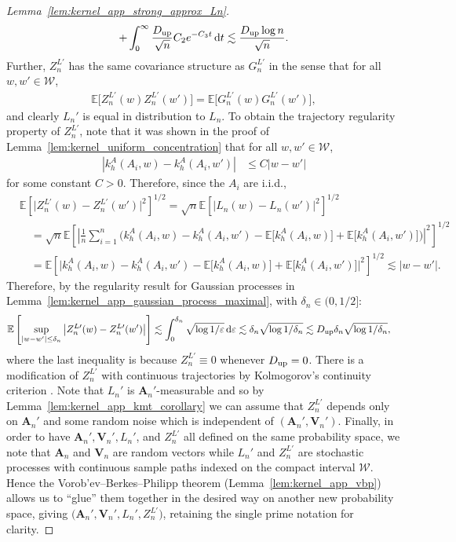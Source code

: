\documentclass[11pt,lof]{puthesis}
\newcommand{\E}{\ensuremath{\mathbb{E}}}
\newcommand{\bA}{\ensuremath{\mathbf{A}}}
\newcommand{\bV}{\ensuremath{\mathbf{V}}}
\newcommand{\cW}{\ensuremath{\mathcal{W}}}
\newcommand{\Du}{\ensuremath{D_{\textup{up}}}}
\newcommand{\diff}[1]{\,\mathrm{d}#1}
\theoremstyle{break}
\theoremstyle{proof}
\newtheorem{proof}{Proof}
\begin{document}
\begin{proof}[Lemma~\ref{lem:kernel_app_strong_approx_Ln}]
\begin{align*}
+ \int_0^\infty
\frac{\Du}{\sqrt n}
C_2 e^{-C_3 t}
\diff{t}
\lesssim
\frac{\Du \log n}{\sqrt n}.
\end{align*}
%
Further,
$Z_n^{L\prime}$ has the
same covariance structure as $G_n^{L\prime}$ in the
sense that for all $w, w' \in \cW$,
%
\begin{align*}
\E\big[Z_n^{L\prime}(w) Z_n^{L\prime}(w')\big]
= \E\big[G_n^{L\prime}(w) G_n^{L\prime}(w')\big],
\end{align*}
%
and clearly $L_n'$
is equal in distribution to $L_n$.
To obtain the trajectory regularity property of
$Z_n^{L\prime}$,
note that it was shown in the proof of
Lemma~\ref{lem:kernel_uniform_concentration}
that for all $w,w' \in \cW$,
%
\begin{align*}
\left|
k_h^A(A_i,w)
- k_h^A(A_i,w')
\right|
&\leq
C
|w-w'|
\end{align*}
%
for some constant $C > 0$.
Therefore, since the $A_i$ are i.i.d.,
%
\begin{align*}
&\E\left[
\big|
Z_n^{L\prime}(w)
- Z_n^{L\prime}(w')
\big|^2
\right]^{1/2}
=
\sqrt{n}
\E\left[
\big|
L_n(w)
- L_n(w')
\big|^2
\right]^{1/2} \\
&\quad=
\sqrt{n}
\E\left[
\left|
\frac{1}{n}
\sum_{i=1}^n
\Big(
k_h^A(A_i,w)
- k_h^A(A_i,w')
- \E\big[k_h^A(A_i,w)]
+ \E\big[k_h^A(A_i,w')]
\Big)
\right|^2
\right]^{1/2} \\
&\quad=
\E\left[
\Big|
k_h^A(A_i,w)
- k_h^A(A_i,w')
- \E\big[k_h^A(A_i,w)]
+ \E\big[k_h^A(A_i,w')]
\Big|^2
\right]^{1/2}
\lesssim
|w-w'|.
\end{align*}
%
Therefore, by
the regularity result for Gaussian processes in
Lemma~\ref{lem:kernel_app_gaussian_process_maximal},
with $\delta_n \in (0, 1/2]$:
%
\begin{align*}
\E\left[
\sup_{|w-w'| \leq \delta_n}
\big|
Z_n^{L\prime}(w)
- Z_n^{L\prime}(w')
\big|
\right]
&\lesssim
\int_0^{\delta_n}
\sqrt{\log 1/\varepsilon}
\diff{\varepsilon}
\lesssim
\delta_n \sqrt{\log 1/\delta_n}
\lesssim
\Du
\delta_n \sqrt{\log 1/\delta_n},
\end{align*}
%
where the last inequality is because
$Z_n^{L\prime} \equiv 0$ whenever $\Du = 0$.
There is a modification of $Z_n^{L\prime}$
with continuous trajectories
by Kolmogorov's continuity criterion
\citep[Theorem~2.9]{legall2016brownian}.
Note that $L_n'$ is $\bA_n'$-measurable
and so by Lemma~\ref{lem:kernel_app_kmt_corollary}
we can assume that $Z_n^{L\prime}$
depends only on $\bA_n'$ and some
random noise which is independent of
$(\bA_n', \bV_n')$.
Finally, in order to have
$\bA_n', \bV_n', L_n'$, and $Z_n^{L\prime}$
all defined on the same probability space,
we note that $\bA_n$ and $\bV_n$ are random vectors
while $L_n'$ and $Z_n^{L\prime}$
are stochastic processes
with continuous sample paths
indexed on
the compact interval $\cW$.
Hence the Vorob'ev--Berkes--Philipp theorem
(Lemma~\ref{lem:kernel_app_vbp})
allows us to ``glue'' them together
in the desired way
on another new probability space, giving
$\big(\bA_n', \bV_n', L_n', Z_n^{L\prime}\big)$,
retaining the single prime notation for clarity.
\end{proof}
\end{document}
